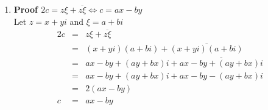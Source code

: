\documentclass{article}%
\newenvironment{proof}[1][]{\begin{samepage}\textbf{Proof #1} }{\end{samepage}}
\begin{document}
\begin{enumerate}
\begin{enumerate}[label*=\arabic*.]
\begin{enumerate}[label=\alph*]
\begin{proof}
\begin{eqnarray*}
                                 &=&\frac{x^2-y^2-2xyi}{(x^2-y^2)^2}
                \end{eqnarray*}
            \end{proof}
        \end{enumerate}
        \item %
        \begin{proof}[$2c=z\xi+\overline{z\xi} \Leftrightarrow c=ax-by$]
            \\ Let $z=x+yi$ and $\xi=a+bi$
            \begin{eqnarray*}
                2c&=&z\xi + \overline{z\xi} \\
                  &=&(x+yi)(a+bi) + \overline{(x+yi)(a+bi)} \\
                  &=&ax-by+(ay+bx)i+\overline{ax-by+(ay+bx)i} \\
                  &=&ax-by+(ay+bx)i+ax-by-(ay+bx)i \\
                  &=&2(ax-by) \\
                 c&=&ax-by
            \end{eqnarray*}
        \end{proof}
    \end{enumerate}
\end{enumerate}
\end{document}

